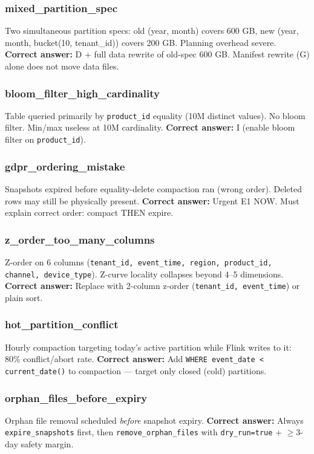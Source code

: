 \documentclass[11pt,a4paper]{article}
\newcommand{\code}[1]{\texttt{#1}}
\begin{document}
\subsubsection{mixed\_partition\_spec}
Two simultaneous partition specs: old (year, month) covers 600 GB, new
(year, month, bucket(10, tenant\_id)) covers 200 GB.  Planning overhead severe.
\textbf{Correct answer:} D + full data rewrite of old-spec 600 GB.
Manifest rewrite (G) alone does not move data files.

\subsubsection{bloom\_filter\_high\_cardinality}
Table queried primarily by \code{product\_id} equality (10M distinct values).
No bloom filter.  Min/max useless at 10M cardinality.
\textbf{Correct answer:} I (enable bloom filter on \code{product\_id}).

\subsubsection{gdpr\_ordering\_mistake}
Snapshots expired before equality-delete compaction ran (wrong order).
Deleted rows may still be physically present.
\textbf{Correct answer:} Urgent E1 NOW.  Must explain correct order:
compact THEN expire.

\subsubsection{z\_order\_too\_many\_columns}
Z-order on 6 columns (\code{tenant\_id, event\_time, region, product\_id,
channel, device\_type}).  Z-curve locality collapses beyond 4--5 dimensions.
\textbf{Correct answer:} Replace with 2-column z-order
(\code{tenant\_id, event\_time}) or plain sort.

\subsubsection{hot\_partition\_conflict}
Hourly compaction targeting today's active partition while Flink writes to it:
80\% conflict/abort rate.
\textbf{Correct answer:} Add \code{WHERE event\_date < current\_date()} to
compaction --- target only closed (cold) partitions.

\subsubsection{orphan\_files\_before\_expiry}
Orphan file removal scheduled \emph{before} snapshot expiry.
\textbf{Correct answer:} Always \code{expire\_snapshots} first, then
\code{remove\_orphan\_files} with \code{dry\_run=true} + $\geq$3-day safety margin.
\end{document}
